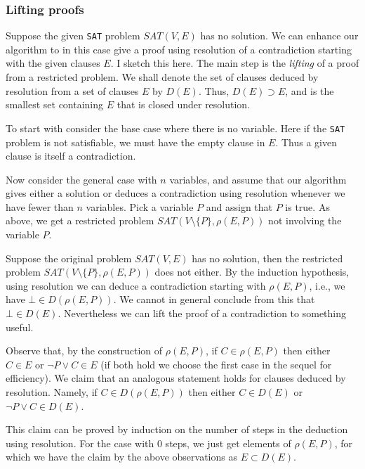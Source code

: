 \hypertarget{lifting-proofs}{%
\subsubsection{Lifting proofs}\label{lifting-proofs}}

Suppose the given \texttt{SAT} problem \(SAT(V, E)\) has no solution. We
can enhance our algorithm to in this case give a proof using resolution
of a contradiction starting with the given clauses \(E\). I sketch this
here. The main step is the \emph{lifting} of a proof from a restricted
problem. We shall denote the set of clauses deduced by resolution from a
set of clauses \(E\) by \(D(E)\). Thus, \(D(E)\supset E\), and is the
smallest set containing \(E\) that is closed under resolution.

To start with consider the base case where there is no variable. Here if
the \texttt{SAT} problem is not satisfiable, we must have the empty
clause in \(E\). Thus a given clause is itself a contradiction.

Now consider the general case with \(n\) variables, and assume that our
algorithm gives either a solution or deduces a contradiction using
resolution whenever we have fewer than \(n\) variables. Pick a variable
\(P\) and assign that \(P\) is true. As above, we get a restricted
problem \(SAT(V\setminus\{P\}, \rho(E, P))\) not involving the variable
\(P\).

Suppose the original problem \(SAT(V, E)\) has no solution, then the
restricted problem \(SAT(V\setminus\{P\}, \rho(E, P))\) does not either.
By the induction hypothesis, using resolution we can deduce a
contradiction starting with \(\rho(E, P)\), i.e., we have
\(\bot\in D(\rho(E, P))\). We cannot in general conclude from this that
\(\bot\in D(E)\). Nevertheless we can lift the proof of a contradiction
to something useful.

Observe that, by the construction of \(\rho(E, P)\), if
\(C \in \rho(E, P)\) then either \(C \in E\) or \(\neg P\vee C\in E\)
(if both hold we choose the first case in the sequel for efficiency). We
claim that an analogous statement holds for clauses deduced by
resolution. Namely, if \(C \in D(\rho(E, P))\) then either
\(C \in D(E)\) or \(\neg P\vee C\in D(E)\).

This claim can be proved by induction on the number of steps in the
deduction using resolution. For the case with \(0\) steps, we just get
elements of \(\rho(E, P)\), for which we have the claim by the above
observations as \(E\subset D(E)\).

